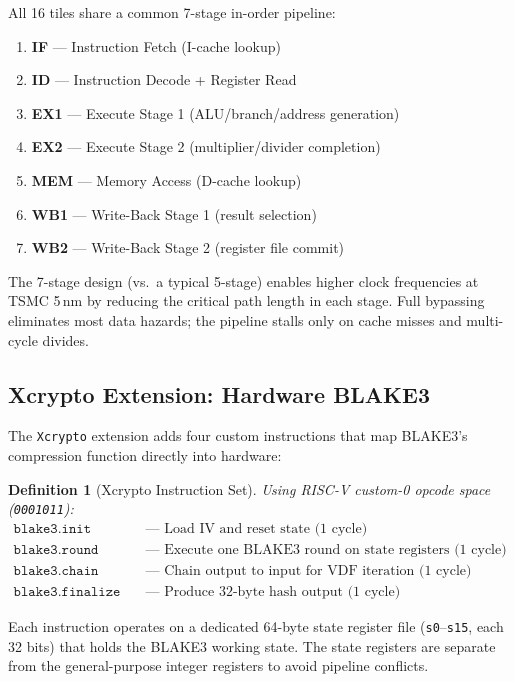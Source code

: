 \documentclass[11pt,a4paper]{article}
\newtheorem{definition}[theorem]{Definition}
\begin{document}
All 16 tiles share a common 7-stage in-order pipeline:

\begin{enumerate}
    \item \textbf{IF} --- Instruction Fetch (I-cache lookup)
    \item \textbf{ID} --- Instruction Decode + Register Read
    \item \textbf{EX1} --- Execute Stage 1 (ALU/branch/address generation)
    \item \textbf{EX2} --- Execute Stage 2 (multiplier/divider completion)
    \item \textbf{MEM} --- Memory Access (D-cache lookup)
    \item \textbf{WB1} --- Write-Back Stage 1 (result selection)
    \item \textbf{WB2} --- Write-Back Stage 2 (register file commit)
\end{enumerate}

The 7-stage design (vs.\ a typical 5-stage) enables higher clock frequencies at TSMC 5\,nm by reducing the critical path length in each stage. Full bypassing eliminates most data hazards; the pipeline stalls only on cache misses and multi-cycle divides.

\subsection{Xcrypto Extension: Hardware BLAKE3}

The \texttt{Xcrypto} extension adds four custom instructions that map BLAKE3's compression function directly into hardware:

\begin{definition}[Xcrypto Instruction Set]
\label{def:xcrypto}
Using RISC-V custom-0 opcode space (\texttt{0001011}):
\begin{align}
    \texttt{blake3.init} &\quad\text{--- Load IV and reset state (1 cycle)} \\
    \texttt{blake3.round} &\quad\text{--- Execute one BLAKE3 round on state registers (1 cycle)} \\
    \texttt{blake3.chain} &\quad\text{--- Chain output to input for VDF iteration (1 cycle)} \\
    \texttt{blake3.finalize} &\quad\text{--- Produce 32-byte hash output (1 cycle)}
\end{align}
\end{definition}

Each instruction operates on a dedicated 64-byte state register file (\texttt{s0}--\texttt{s15}, each 32 bits) that holds the BLAKE3 working state. The state registers are separate from the general-purpose integer registers to avoid pipeline conflicts.
\end{document}
